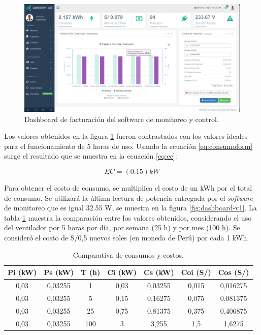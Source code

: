 \begin{landscape} %
\begin{figure}[htpb]
\centering 
\includegraphics[width=1.7\textwidth]{./Figures/test/consumo/consumo.png}
\caption{Dashboard de facturación del software de monitoreo y control.}
\label{fig:dashboard-consumo}
\end{figure}
\end{landscape} %

Los valores obtenidos en la figura \ref{fig:dashboard-consumo} fueron contrastados con los valores ideales para el funcionamiento de 5 horas de uso. Usando la ecuación \ref{eq:consumoform} surge el resultado que se muestra en la ecuación \ref{eq:ec}:

\begin{equation}
	\label{eq:ec}
	EC = \left( 0.15 \right) kW
\end{equation}


Para obtener el costo de consumo, se multiplica el costo de un kWh por el total de consumo. Se utilizará la última lectura de potencia entregada por el \emph{software} de monitoreo que es igual 32.55 W, se muestra en la figura \ref{fig:dashboard-v1}. La tabla \ref{tab:tablacostos} muestra la comparación entre los valores obtenidos, considerando el uso del ventilador por 5 horas por día, por semana (25 h) y por mes (100 h). Se consideró el costo de S/0,5 nuevos soles (en moneda de Perú) por cada 1 kWh.

\begin{table}[h]
	\centering
	\caption[Comparativa de consumos y costos]{Comparativa de consumos y costos.}
	\begin{tabular}{c c c c c c c}    
		\toprule
		\textbf{Pi (kW)} 	 & \textbf{Ps (kW)}  & \textbf{T (h)} &\textbf{Ci (kW)} &\textbf{Cs (kW)} &\textbf{Coi (S/)} &\textbf{Cos (S/)}\\
		\midrule
		0,03 & 0,03255 & 1 & 0,03 & 0,03255 & 0,015 & 0,016275\\		
		0,03 & 0,03255 & 5 & 0,15 & 0,16275 & 0,075 & 0,081375 \\
		0,03 & 0,03255 & 25 & 0,75 & 0,81375 & 0,375 & 0,406875\\		
		0,03 & 0,03255 & 100 & 3 & 3,255 & 1,5 & 1,6275\\		
		
		\bottomrule
		\hline
	\end{tabular}
	\label{tab:tablacostos}
\end{table}

